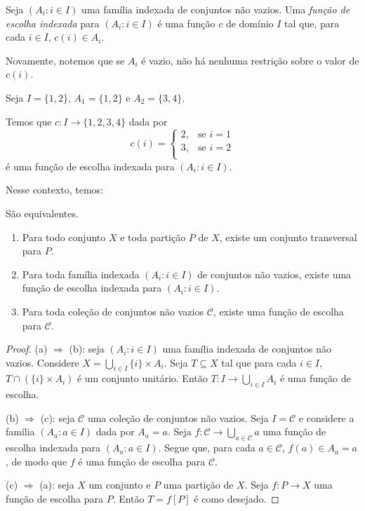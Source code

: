 \begin{definition}[$Z^--P$]
    Seja $(A_i: i\in I)$ uma família indexada de conjuntos não vazios.
    Uma \emph{função de escolha indexada} para $(A_i: i\in I)$ é uma função $c$ de domínio $I$ tal que, para cada $i\in I$, $c(i)\in A_i$.
\end{definition}
Novamente, notemos que se $A_i$ é vazio, não há nenhuma restrição sobre o valor de $c(i)$.

\begin{example}[$Z^--P$]
    Seja $I=\{1, 2\}$, $A_1=\{1, 2\}$ e $A_2=\{3, 4\}$.

    Temos que $c:I\to \{1, 2, 3, 4\}$ dada por
    \[
        c(i) = \begin{cases}
            2, & \text{se } i=1\\
            3, & \text{se } i=2\\
        \end{cases}
    \]
    é uma função de escolha indexada para $(A_i: i\in I)$.
\end{example}

Nesse contexto, temos:

\begin{proposition}[$ZF^--P$]\label{prop:equivalenciaAxiomaEscolha}
    São equivalentes.
    \begin{enumerate}[label=(\alph*)]
        \item Para todo conjunto $X$ e toda partição $P$ de $X$, existe um conjunto transversal para $P$.
        \item Para toda família indexada $(A_i: i\in I)$ de conjuntos não vazios, existe uma função de escolha indexada para $(A_i: i\in I)$.
        \item Para toda coleção de conjuntos não vazios $\mathcal C$, existe uma função de escolha para $\mathcal C$.
    \end{enumerate}
\end{proposition}
\begin{proof}
    (a) $\Rightarrow$ (b): seja $(A_i: i\in I)$ uma família indexada de conjuntos não vazios.
    Considere $X=\bigcup_{i\in I} \{i\}\times A_i$.
    Seja $T\subseteq X$ tal que para cada $i\in I$, $T\cap (\{i\}\times A_i)$ é um conjunto unitário.
    Então $T:I\rightarrow \bigcup_{i\in I} A_i$ é uma função de escolha.

    (b) $\Rightarrow$ (c): seja $\mathcal C$ uma coleção de conjuntos não vazios.
    Seja $I=\mathcal C$ e considere a família $(A_a: a\in I)$ dada por $A_a=a$.
    Seja $f:\mathcal C\to \bigcup_{a\in \mathcal C} a$ uma função de escolha indexada para $(A_a: a\in I)$.
    Segue que, para cada $a\in \mathcal C$, $f(a)\in A_a=a$, de modo que $f$ é uma função de escolha para $\mathcal C$.

    (c) $\Rightarrow$ (a): seja $X$ um conjunto e $P$ uma partição de $X$.
    Seja $f:P\to X$ uma função de escolha para $P$.
    Então $T=f[P]$ é como desejado.
\end{proof}

